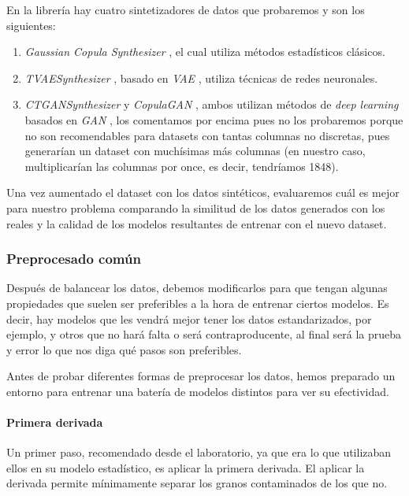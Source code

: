 En la librería hay cuatro sintetizadores de datos que probaremos y son los siguientes:

\begin{enumerate}
    \item \textit{Gaussian Copula Synthesizer} \cite{Gaussian4:online}, el cual utiliza métodos estadísticos clásicos.
    \item \textit{TVAESynthesizer} \cite{TVAESynt0:online}, basado en \textit{VAE} \cite{Variatio61:online}, utiliza técnicas de redes neuronales.
    \item \textit{CTGANSynthesizer} \cite{CTGANSyn50:online} y \textit{CopulaGAN} \cite{CopulaGA37:online}, ambos utilizan métodos de \textit{deep learning} basados en \textit{GAN} \cite{Generati72:online}, los comentamos por encima pues no los probaremos porque no son recomendables para datasets con tantas columnas no discretas, pues generarían un dataset con muchísimas más columnas (en nuestro caso, multiplicarían las columnas por once, es decir, tendríamos 1848). 
\end{enumerate}

Una vez aumentado el dataset con los datos sintéticos, evaluaremos cuál es mejor para nuestro problema comparando la similitud de los datos generados con los reales y la calidad de los modelos resultantes de entrenar con el nuevo dataset.


\subsubsection{Preprocesado común}

Después de balancear los datos, debemos modificarlos para que tengan algunas propiedades que suelen ser preferibles a la hora de entrenar ciertos modelos. Es decir, hay modelos que les vendrá mejor tener los datos estandarizados, por ejemplo, y otros que no hará falta o será contraproducente, al final será la prueba y error lo que nos diga qué pasos son preferibles.

Antes de probar diferentes formas de preprocesar los datos, hemos preparado un entorno para entrenar una batería de modelos distintos para ver su efectividad.

\paragraph{Primera derivada}

Un primer paso, recomendado desde el laboratorio, ya que era lo que utilizaban ellos en su modelo estadístico, es aplicar la primera derivada. El aplicar la derivada permite mínimamente separar los granos contaminados de los que no.


